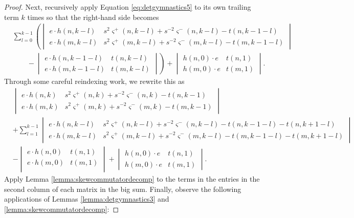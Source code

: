 \begin{proof}
Next, recursively apply Equation \ref{eq:detgymnastics5} to its own trailing term $k$ times so that the right-hand side becomes
\begin{align*}
&\sum_{l=0}^{k-1} \left(
\begin{vmatrix}
e \cdot h(n, k-l) & s^2 \varsigma^+ (n, k-l) + s^{-2} \varsigma^- (n, k-l) - t(n, k-1-l) \\
e \cdot h(m, k-l) & s^2 \varsigma^+ (m, k-l) + s^{-2} \varsigma^- (m, k-l) - t(m, k-1-l)
\end{vmatrix} \right. \\
& \left. \qquad -
\begin{vmatrix}
e \cdot h(n, k-1-l) & t(n, k-l) \\
e \cdot h(m, k-1-l) & t(m, k-l)
\end{vmatrix} \right)
+
\begin{vmatrix}
h(n, 0) \cdot e & t(n, 1) \\
h(m, 0) \cdot e & t(m, 1)
\end{vmatrix}.
\end{align*}
Through some careful reindexing work, we rewrite this as
\begin{align*}
&\begin{vmatrix}
e \cdot h(n, k) & s^2 \varsigma^+ (n, k) + s^{-2} \varsigma^- (n, k) - t(n, k-1) \\
e \cdot h(m, k) & s^2 \varsigma^+ (m, k) + s^{-2} \varsigma^- (m, k) - t(m, k-1)
\end{vmatrix}\\
&+
\sum_{l=1}^{k-1}
\begin{vmatrix}
e \cdot h(n, k-l) & s^2 \varsigma^+ (n, k-l) + s^{-2} \varsigma^- (n, k-l) - t(n, k-1-l) - t(n, k+1-l)\\
e \cdot h(m, k-l) & s^2 \varsigma^+ (m, k-l) + s^{-2} \varsigma^- (m, k-l) - t(m, k-1-l) - t(m, k+1-l)
\end{vmatrix} \\
&-
\begin{vmatrix}
e \cdot h(n, 0) & t(n, 1) \\
e \cdot h(m, 0) & t(m, 1) \\
\end{vmatrix}
+
\begin{vmatrix}
h(n, 0) \cdot e & t(n, 1) \\
h(m, 0) \cdot e & t(m, 1)
\end{vmatrix}.
\end{align*}
Apply Lemma \ref{lemma:skewcommutatordecomp} to the terms in the entries in the second column of each matrix in the big sum. Finally, observe the following applications of Lemmas \ref{lemma:detgymnastics3} and  \ref{lemma:skewcommutatordecomp}:

\end{proof}
